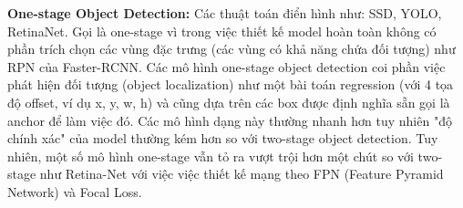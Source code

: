 \documentclass[a4paper, 12pt]{report}
\begin{document}
\textbf{One-stage Object Detection:} Các thuật toán điển hình như: SSD, YOLO, RetinaNet. Gọi là one-stage vì trong việc thiết kế model hoàn toàn không có phần trích chọn các vùng đặc trưng (các vùng có khả năng chứa đối tượng) như RPN của Faster-RCNN. Các mô hình one-stage object detection coi phần việc phát hiện đối tượng (object localization) như một bài toán regression (với 4 tọa độ offset, ví dụ x, y, w, h) và cũng dựa trên các box được định nghĩa sẵn gọi là anchor để làm việc đó. Các mô hình dạng này thường nhanh hơn tuy nhiên "độ chính xác" của model thường kém hơn so với two-stage object detection. Tuy nhiên, một số mô hình one-stage vẫn tỏ ra vượt trội hơn một chút so với two-stage như Retina-Net với việc việc thiết kế mạng theo FPN (Feature Pyramid Network) và Focal Loss.\par
\end{document}
